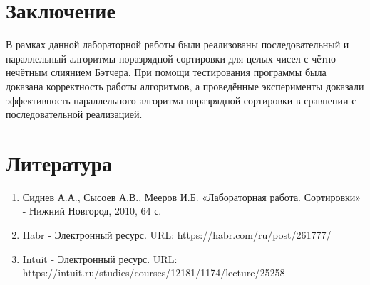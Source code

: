 \documentclass{report}
\begin{document}
\section*{Заключение}
\par В рамках данной лабораторной работы были реализованы последовательный и параллельный алгоритмы поразрядной сортировки для целых чисел с чётно-нечётным слиянием Бэтчера. При помощи тестирования программы была доказана корректность работы алгоритмов, а проведённые эксперименты доказали эффективность параллельного алгоритма поразрядной сортировки в сравнении с последовательной реализацией.
\newpage

\section*{Литература}
\begin{enumerate}
\item Сиднев А.А., Сысоев А.В., Мееров И.Б. «Лабораторная работа. Сортировки» - Нижний Новгород, 2010, 64 с. 
\item Habr - Электронный ресурс. URL: https://habr.com/ru/post/261777/
\item Intuit - Электронный ресурс. URL: https://intuit.ru/studies/courses/12181/1174/lecture/25258
\end{enumerate} 
\newpage

\end{document}

